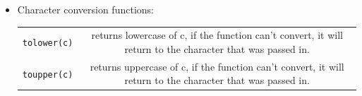 \begin{itemize}
    \item Character conversion functions:
        \begin{center}
            \begin{tabular}{ |c|c| }
                \hline
                    \texttt{tolower(c)} & returns lowercase of c, if the function can't convert, it will return to the character that was passed in. \\
                    \texttt{toupper(c)} & returns uppercase of c, if the function can't convert, it will return to the character that was passed in. \\
                \hline
            \end{tabular}
        \end{center}
\end{itemize}


